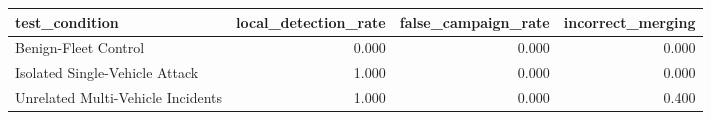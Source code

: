 \begin{tabular}{lrrr}
\toprule
test_condition & local_detection_rate & false_campaign_rate & incorrect_merging \\
\midrule
Benign-Fleet Control & 0.000 & 0.000 & 0.000 \\
Isolated Single-Vehicle Attack & 1.000 & 0.000 & 0.000 \\
Unrelated Multi-Vehicle Incidents & 1.000 & 0.000 & 0.400 \\
\bottomrule
\end{tabular}
